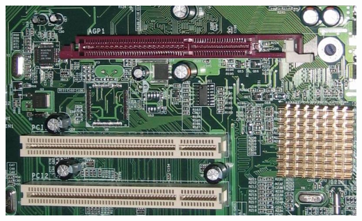 \documentclass[aspectratio=43]{beamer}
\begin{document}
\begin{frame}{}
	\begin{center}
		\includegraphics[width=0.8\linewidth]{extrahovane_obrazky/agp.jpeg}
	\end{center}
	
\end{frame}
\end{document}
